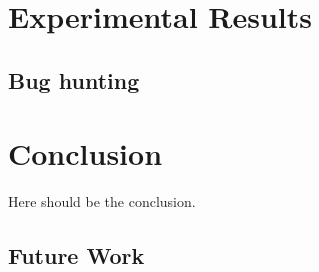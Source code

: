 \documentclass[draft]{llncs}
\begin{document}

\vspace*{-0mm}\section{Experimental Results}\vspace*{-0mm}


\vspace*{-0mm}\subsection{Bug hunting}\vspace*{-0mm}


\vspace*{-0mm}\section{Conclusion}\vspace*{-0mm} \label{sec:conclusion}

Here should be the conclusion.

\vspace*{-0mm}\subsection{Future Work}\vspace*{-0mm}


\end{document}
